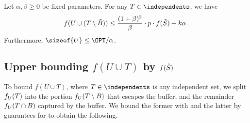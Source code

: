 \documentclass[oneside,letterpaper]{scrartcl} \usepackage{macros}
\begin{document}
\begin{lemma}
  Let $\alpha, \beta \geq 0$ be fixed parameters. For any $T \in
  \independents$, we have
  \begin{align*}
    f(U \cup (T \setminus \tilde{B})) \leq \frac{(1 + \beta)^2}{\beta} \cdot p \cdot f(\tilde{S}) + k \alpha.
  \end{align*}
  Furthermore, $\sizeof{\takens} \leq \OPT/\alpha$.
\end{lemma}

\subsection{Upper bounding $f(U \cup T)$ by $f(\hat{S})$}

To bound $f(U \cup T)$, where $T \in \independents$ is any independent
set, we split $f_{U}(T)$ into the portion $f_{U}(T
\setminus B)$ that escapes the buffer, and the remainder
$f_{U}(T \cap B)$ captured by the buffer. We bound the
former with  and the latter by
guarantees for  to obtain the following.
\end{document}
